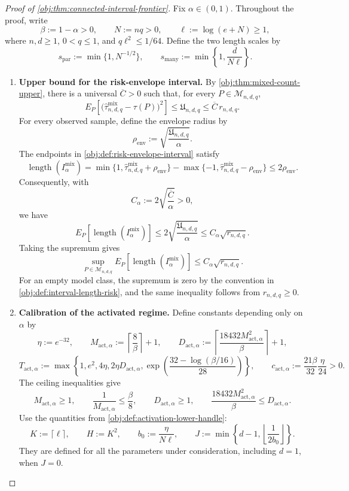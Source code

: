 \documentclass[11pt]{article}
\begin{document}
\begin{proof}[Proof of \cref{obj:thm:connected-interval-frontier}]
Fix \(\alpha\in(0,1)\). Throughout the proof, write
\[
\beta:=1-\alpha>0,\qquad
N:=nq>0,\qquad
\ell:=\log(e+N)\ge1,
\]
where \(n,d\ge1\), \(0<q\le1\), and \(q\ell^2\le1/64\).
Define the two length scales by
\[
s_{\mathrm{par}}:=\min\{1,N^{-1/2}\},
\qquad
s_{\mathrm{many}}:=\min\left\{1,\frac{d}{N\ell}\right\}.
\]

\begin{enumerate}
\item \label{proof:connected-interval-upper}\textbf{Upper bound for the risk-envelope interval.}
By \cref{obj:thm:mixed-count-upper}, there is a universal
\(\overline C>0\) such that, for every \(P\in\mathcal M_{n,d,q}\),
\[
E_P\!\left[
  \bigl(\widehat\tau^{\mathrm{mix}}_{n,d,q}-\tau(P)\bigr)^2
\right]
\le \mathfrak U_{n,d,q}
\le \overline C\,r_{n,d,q}.
\]
For every observed sample, define the envelope radius by
\[
\rho_{\mathrm{env}}
:=\sqrt{\frac{\mathfrak U_{n,d,q}}{\alpha}}.
\]
The endpoints in \cref{obj:def:risk-envelope-interval} satisfy
\[
\operatorname{length}(I^{\mathrm{mix}}_\alpha)
=
\min\{1,\widehat\tau^{\mathrm{mix}}_{n,d,q}+\rho_{\mathrm{env}}\}
-
\max\{-1,\widehat\tau^{\mathrm{mix}}_{n,d,q}-\rho_{\mathrm{env}}\}
\le 2\rho_{\mathrm{env}}.
\]
Consequently, with
\[
C_\alpha:=2\sqrt{\frac{\overline C}{\alpha}}>0,
\]
we have
\[
E_P[\operatorname{length}(I^{\mathrm{mix}}_\alpha)]
\le
2\sqrt{\frac{\mathfrak U_{n,d,q}}{\alpha}}
\le C_\alpha\sqrt{r_{n,d,q}}.
\]
Taking the supremum gives
\[
\sup_{P\in\mathcal M_{n,d,q}}
E_P[\operatorname{length}(I^{\mathrm{mix}}_\alpha)]
\le C_\alpha\sqrt{r_{n,d,q}}.
\]
For an empty model class, the supremum is zero by the convention in
\cref{obj:def:interval-length-risk}, and the same inequality follows from
\(r_{n,d,q}\ge0\).

\item \label{proof:connected-interval-calibration}\textbf{Calibration of the activated regime.}
Define constants depending only on \(\alpha\) by
\[
\eta:=e^{-32},\qquad
M_{\mathrm{act},\alpha}:=\left\lceil\frac8\beta\right\rceil+1,
\qquad
D_{\mathrm{act},\alpha}
:=
\left\lceil
\frac{18432M_{\mathrm{act},\alpha}^2}{\beta}
\right\rceil+1,
\]
\[
T_{\mathrm{act},\alpha}
:=
\max\left\{
1,e^2,4\eta,2\eta D_{\mathrm{act},\alpha},
\exp\left(\frac{32-\log(\beta/16)}{28}\right)
\right\},
\qquad
c_{\mathrm{act},\alpha}
:=\frac{21\beta}{32}\frac{\eta}{24}>0.
\]
The ceiling inequalities give
\[
M_{\mathrm{act},\alpha}\ge1,\qquad
\frac1{M_{\mathrm{act},\alpha}}\le\frac\beta8,\qquad
D_{\mathrm{act},\alpha}\ge1,\qquad
\frac{18432M_{\mathrm{act},\alpha}^2}{\beta}
\le D_{\mathrm{act},\alpha}.
\]
Use the quantities from \cref{obj:def:activation-lower-handle}:
\[
K:=\lceil\ell\rceil,\qquad H:=K^2,\qquad
b_0:=\frac{\eta}{N\ell},\qquad
J:=\min\left\{d-1,\left\lfloor\frac1{2b_0}\right\rfloor\right\}.
\]
They are defined for all the parameters under consideration, including
\(d=1\), when \(J=0\).


\end{enumerate}
\end{proof}
\end{document}
